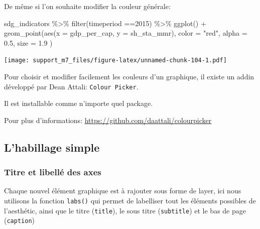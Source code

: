 \documentclass[
]{book}
\newenvironment{Shaded}{\begin{snugshade}}{\end{snugshade}}
\newcommand{\AttributeTok}[1]{\textcolor[rgb]{0.77,0.63,0.00}{#1}}
\newcommand{\DecValTok}[1]{\textcolor[rgb]{0.00,0.00,0.81}{#1}}
\newcommand{\FloatTok}[1]{\textcolor[rgb]{0.00,0.00,0.81}{#1}}
\newcommand{\FunctionTok}[1]{\textcolor[rgb]{0.00,0.00,0.00}{#1}}
\newcommand{\NormalTok}[1]{#1}
\newcommand{\SpecialCharTok}[1]{\textcolor[rgb]{0.00,0.00,0.00}{#1}}
\newcommand{\StringTok}[1]{\textcolor[rgb]{0.31,0.60,0.02}{#1}}
\begin{document}
De même si l'on souhaite modifier la couleur générale:

\begin{Shaded}
\begin{Highlighting}[]
\NormalTok{sdg\_indicators }\SpecialCharTok{\%\textgreater{}\%} 
  \FunctionTok{filter}\NormalTok{(timeperiod }\SpecialCharTok{==}\DecValTok{2015}\NormalTok{) }\SpecialCharTok{\%\textgreater{}\%} 
  \FunctionTok{ggplot}\NormalTok{() }\SpecialCharTok{+}
  \FunctionTok{geom\_point}\NormalTok{(}\FunctionTok{aes}\NormalTok{(}\AttributeTok{x =}\NormalTok{ gdp\_per\_cap, }
                 \AttributeTok{y =}\NormalTok{ sh\_sta\_mmr),}
    \AttributeTok{color =} \StringTok{"red"}\NormalTok{,}
    \AttributeTok{alpha =} \FloatTok{0.5}\NormalTok{, }
    \AttributeTok{size =} \FloatTok{1.9}
\NormalTok{  )}
\end{Highlighting}
\end{Shaded}

\texttt{[image: support\_m7\_files/figure-latex/unnamed-chunk-104-1.pdf]}

Pour choisir et modifier facilement les couleurs d'un graphique, il existe un addin développé par Dean Attali: \texttt{Colour\ Picker}.

Il est installable comme n'importe quel package.

Pour plus d'informations: \url{https://github.com/daattali/colourpicker}

\hypertarget{lhabillage-simple}{%
\subsection{L'habillage simple}\label{lhabillage-simple}}

\hypertarget{titre-et-libelluxe9-des-axes}{%
\subsubsection{Titre et libellé des axes}\label{titre-et-libelluxe9-des-axes}}

Chaque nouvel élément graphique est à rajouter sous forme de layer, ici nous utilisons la fonction \texttt{labs()} qui permet de labelliser tout les éléments possibles de l'aesthétic, ainsi que le titre (\texttt{title}), le sous titre (\texttt{subtitle}) et le bas de page (\texttt{caption})
\end{document}
